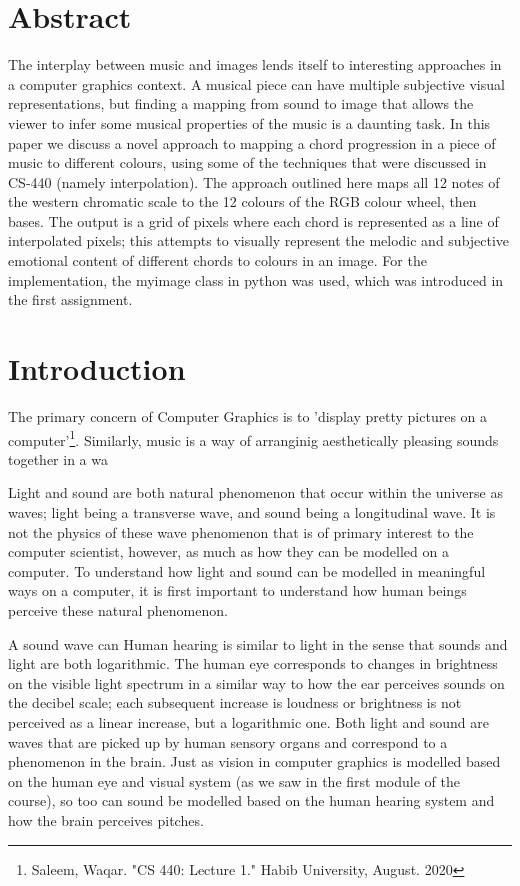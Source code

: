 \documentclass{article}
\begin{document}
\tableofcontents
\newpage
\section{Abstract}

The interplay between music and images lends itself to interesting approaches in a computer graphics context. A musical piece can have multiple subjective visual representations, but finding a mapping from sound to image that allows the viewer to infer some musical properties of the music is a daunting task. In this paper we discuss a novel approach to mapping a chord progression in a piece of music to different colours, using some of the techniques that were discussed in CS-440 (namely interpolation). The approach outlined here maps all 12 notes of the western chromatic scale to the 12 colours of the RGB colour wheel, then bases. The output is a grid of pixels where each chord is represented as a line of interpolated pixels; this attempts to visually represent the melodic and subjective emotional content of different chords to colours in an image. For the implementation, the myimage class in python was used, which was introduced in the first assignment.

\section{Introduction}

The primary concern of Computer Graphics is to 'display pretty pictures on a computer'\footnote{Saleem, Waqar. "CS 440: Lecture 1." Habib University, August. 2020}. Similarly, music is a way of arranginig aesthetically pleasing sounds together in a wa



Light and sound are both natural phenomenon that occur within the universe as waves; light being a transverse wave, and sound being a longitudinal wave. It is not the physics of these wave phenomenon that is of primary interest to the computer scientist, however, as much as how they can be modelled on a computer. To understand how light and sound can be modelled in meaningful ways on a computer, it is first important to understand how human beings perceive these natural phenomenon.

A sound wave can 
Human hearing is similar to light in the sense that sounds and light are both logarithmic. The human eye corresponds to changes in brightness on the visible light spectrum in a similar way to how the ear perceives sounds on the decibel scale; each subsequent increase is loudness or brightness is not perceived as a linear increase, but a logarithmic one. Both light and sound are waves that are picked up by human sensory organs and correspond to a phenomenon in the brain. Just as vision in computer graphics is modelled based on the human eye and visual system (as we saw in the first module of the course), so too can sound be modelled based on the human hearing system and how the brain perceives pitches.
\end{document}
